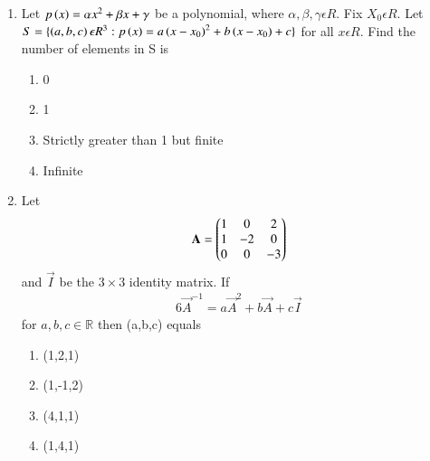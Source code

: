 \begin{enumerate}[label=\thesection.\arabic*.,ref=\thesection.\theenumi]
%
\\
\solution

\item Let $p \left(x\right)= \alpha x^2+\beta x + \gamma$ be a polynomial, where $\alpha,\beta,\gamma \epsilon R$. Fix $X_0 \epsilon R$. Let $S=\{\left(a,b,c\right)  \epsilon R^3: p \left(x\right)= a \left(x-x_0\right)^2+b \left(x-x_0\right)+ c\}$ for all $x\epsilon R$. Find the number of elements in S is
\begin{enumerate}
    \item 0
    \item 1
    \item Strictly greater than 1 but finite
    \item Infinite
\end{enumerate}
%
\solution

\item Let
\begin{align}
\mathbf{A}=\begin{pmatrix}1&0&2\\1&-2&0\\0&0&-3\end{pmatrix}
\end{align}
and $\vec{I}$ be the $3\times3$ identity matrix. If 
\begin{align}
6\vec{A}^{-1}=a\vec{A}^2+b\vec{A}+c\vec{I} \label{eq:solutions/2017/june/31/eq:1}
\end{align} for $a,b,c \in \mathbb{R}$ then (a,b,c) equals
\begin{enumerate}
\item (1,2,1)\\
\item (1,-1,2)\\
\item (4,1,1)\\
\item (1,4,1)
\end{enumerate}
\solution



\end{enumerate}

